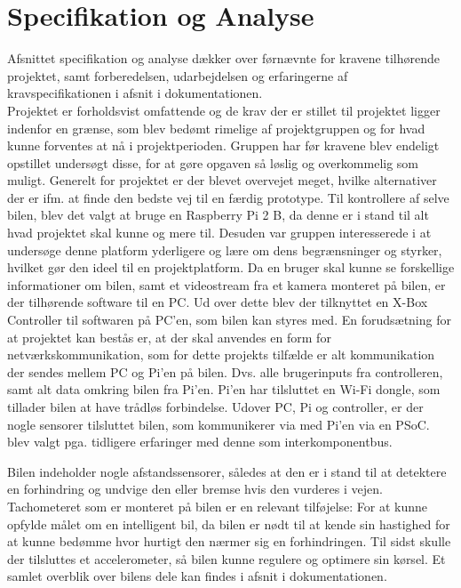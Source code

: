 \section{Specifikation og Analyse}
\label{ch:Specifikation_og_Analyse}

Afsnittet specifikation og analyse dækker over førnævnte for kravene tilhørende projektet, samt forberedelsen, udarbejdelsen og erfaringerne af kravspecifikationen i afsnit  i dokumentationen. \\

Projektet er forholdsvist omfattende og de krav der er stillet til projektet ligger indenfor en grænse, som blev bedømt rimelige af projektgruppen og for hvad kunne forventes at nå i projektperioden. 
Gruppen har før kravene blev endeligt opstillet undersøgt disse, for at gøre opgaven så løslig og overkommelig som muligt.
Generelt for projektet er der blevet overvejet meget, hvilke alternativer der er ifm. at finde den bedste vej til en færdig prototype.
Til kontrollere af selve bilen, blev det valgt at bruge en Raspberry Pi 2 B, da denne er i stand til alt hvad projektet skal kunne og mere til. 
Desuden var gruppen interesserede i at undersøge denne platform yderligere og lære om dens begrænsninger og styrker, hvilket gør den ideel til en projektplatform.
Da en bruger skal kunne se forskellige informationer om bilen, samt et videostream fra et kamera monteret på bilen, er der tilhørende software til en PC. 
Ud over dette blev der tilknyttet en X-Box Controller til softwaren på PC'en, som bilen kan styres med.
En forudsætning for at projektet kan bestås er, at der skal anvendes en form for netværkskommunikation, som for dette projekts tilfælde er alt kommunikation der sendes mellem PC og Pi'en på bilen. Dvs. alle brugerinputs fra controlleren, samt alt data omkring bilen fra Pi'en.
Pi'en har tilsluttet en Wi-Fi dongle, som tillader bilen at have trådløs forbindelse. Udover PC, Pi og controller, er der nogle sensorer tilsluttet bilen, som kommunikerer via \IIC med Pi'en via en PSoC. 
\IIC blev valgt pga. tidligere erfaringer med denne som interkomponentbus. 

Bilen indeholder nogle afstandssensorer, således at den er i stand til at detektere en forhindring og undvige den eller bremse hvis den vurderes i vejen. Tachometeret som er monteret på bilen er en relevant tilføjelse: For at kunne opfylde målet om en intelligent bil, da bilen er nødt til at kende sin hastighed for at kunne bedømme hvor hurtigt den nærmer sig en forhindringen. Til sidst skulle der tilsluttes et accelerometer, så bilen kunne regulere og optimere sin kørsel. 
Et samlet overblik over bilens dele kan findes i afsnit  i dokumentationen.

\clearpage